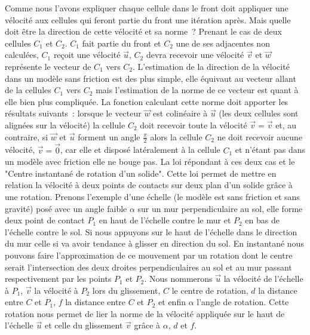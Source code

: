 \documentclass[a4paper,10pt]{article}
\begin{document}
Comme nous l'avons expliquer chaque cellule dans le front doit appliquer une vélocité aux cellules qui feront partie du front une itération après. Mais quelle doit être la direction de cette vélocité et sa norme~?
Prenant le cas de deux cellules $C_1$ et $C_2$. $C_1$ fait partie du front et $C_2$ une de ses adjacentes non calculées, $C_1$ reçoit une vélocité $\overrightarrow{u}$, $C_2$ devra recevoir une vélocité $\overrightarrow{v}$ et $\overrightarrow{w}$ représente le vecteur de $C_1$ vers $C_2$.
L'estimation de la direction de la vélocité dans un modèle sans friction est des plus simple, elle équivaut au vecteur allant de la cellules $C_1$ vers $C_2$ mais l'estimation de la norme de ce vecteur est quant à elle bien plus compliquée.
La fonction calculant cette norme doit apporter les résultats suivants~:
lorsque le vecteur $\overrightarrow{w}$ est colinéaire à $\overrightarrow{u}$ (les deux cellules sont alignées sur la vélocité) la cellule $C_2$ doit recevoir toute la vélocité $\overrightarrow{v} = \overrightarrow{v}$ et, au contraire, si $\overrightarrow{w}$ et $\overrightarrow{u}$ forment un angle $\frac{\pi}{2}$ alors la cellule $C_2$ ne doit recevoir aucune vélocité, $\overrightarrow{v} = \overrightarrow{0}$, car elle et disposé latéralement à la cellule $C_1$ et n'étant pas dans un modèle avec friction elle ne bouge pas.
La loi répondant à ces deux cas et le "Centre instantané de rotation d'un solide". Cette loi permet de mettre en relation la vélocité à deux points de contacts sur deux plan d'un solide grâce à une rotation.
Prenons l'exemple d'une échelle (le modèle est sans friction et sans gravité) posé avec un angle faible $\alpha$ sur un mur perpendiculaire au sol, elle forme deux point de contact $P_1$ en haut de l'échelle contre le mur et $P_2$ en bas de l'échelle contre le sol. Si nous appuyons sur le haut de l'échelle dans le direction du mur celle si va avoir tendance à glisser en direction du sol.
En instantané nous pouvons faire l'approximation de ce mouvement par un rotation dont le centre serait l'intersection des deux droites perpendiculaires au sol et au mur passant respectivement par les points $P_1$ et $P_2$.
Nous nommerons $\overrightarrow{u}$ la vélocité de l'échelle à $P_1$, $\overrightarrow{v}$ la vélocité à $P_2$ lors du glissement, $C$ le centre de rotation, $d$ la distance entre $C$ et $P_1$, $f$ la distance entre $C$ et $P_2$ et enfin $\alpha$ l'angle de rotation.
Cette rotation nous permet de lier la norme de la vélocité appliquée sur le haut de l'échelle $\overrightarrow{u}$ et celle du glissement $\overrightarrow{v}$ grâce à $\alpha$, $d$ et $f$. \\
\end{document}
